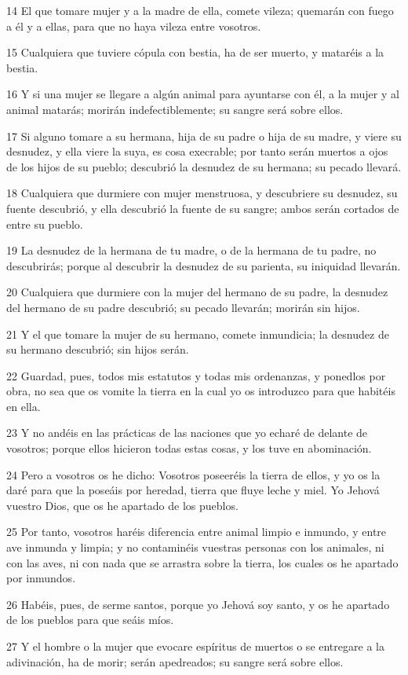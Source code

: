 \par 14 El que tomare mujer y a la madre de ella, comete vileza; quemarán con fuego a él y a ellas, para que no haya vileza entre vosotros.
\par 15 Cualquiera que tuviere cópula con bestia, ha de ser muerto, y mataréis a la bestia.
\par 16 Y si una mujer se llegare a algún animal para ayuntarse con él, a la mujer y al animal matarás; morirán indefectiblemente; su sangre será sobre ellos.
\par 17 Si alguno tomare a su hermana, hija de su padre o hija de su madre, y viere su desnudez, y ella viere la suya, es cosa execrable; por tanto serán muertos a ojos de los hijos de su pueblo; descubrió la desnudez de su hermana; su pecado llevará.
\par 18 Cualquiera que durmiere con mujer menstruosa, y descubriere su desnudez, su fuente descubrió, y ella descubrió la fuente de su sangre; ambos serán cortados de entre su pueblo.
\par 19 La desnudez de la hermana de tu madre, o de la hermana de tu padre, no descubrirás; porque al descubrir la desnudez de su parienta, su iniquidad llevarán.
\par 20 Cualquiera que durmiere con la mujer del hermano de su padre, la desnudez del hermano de su padre descubrió; su pecado llevarán; morirán sin hijos.
\par 21 Y el que tomare la mujer de su hermano, comete inmundicia; la desnudez de su hermano descubrió; sin hijos serán.
\par 22 Guardad, pues, todos mis estatutos y todas mis ordenanzas, y ponedlos por obra, no sea que os vomite la tierra en la cual yo os introduzco para que habitéis en ella.
\par 23 Y no andéis en las prácticas de las naciones que yo echaré de delante de vosotros; porque ellos hicieron todas estas cosas, y los tuve en abominación.
\par 24 Pero a vosotros os he dicho: Vosotros poseeréis la tierra de ellos, y yo os la daré para que la poseáis por heredad, tierra que fluye leche y miel. Yo Jehová vuestro Dios, que os he apartado de los pueblos.
\par 25 Por tanto, vosotros haréis diferencia entre animal limpio e inmundo, y entre ave inmunda y limpia; y no contaminéis vuestras personas con los animales, ni con las aves, ni con nada que se arrastra sobre la tierra, los cuales os he apartado por inmundos.
\par 26 Habéis, pues, de serme santos, porque yo Jehová soy santo, y os he apartado de los pueblos para que seáis míos.
\par 27 Y el hombre o la mujer que evocare espíritus de muertos o se entregare a la adivinación, ha de morir; serán apedreados; su sangre será sobre ellos.

